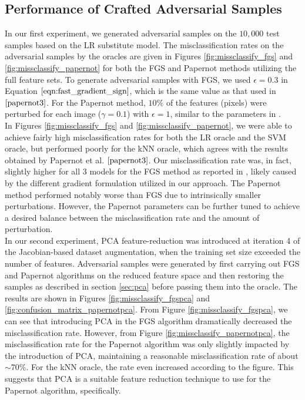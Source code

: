 \subsection{Performance of Crafted Adversarial Samples}
In our first experiment, we generated adversarial samples on the $10,000$ test samples based on the LR substitute model. The misclassification rates on the adversarial samples by the oracles are given in Figures \ref{fig:missclassify_fgs}  and \ref{fig:missclassify_papernot} for both the FGS and Papernot methods utilizing the full feature sets. To generate adversarial samples with FGS, we used $\epsilon = 0.3$ in Equation $\ref{eqn:fast_gradient_sign}$, which is the same value as that used in $\cite{papernot3}$. For the Papernot method, $10\%$ of the features (pixels) were perturbed for each image ($\gamma = 0.1$) with $\epsilon = 1$, similar to the parameters in \cite{papernot1}. \\
\indent In Figures \ref{fig:missclassify_fgs}  and \ref{fig:missclassify_papernot}, we were able to achieve fairly high misclassification rates for both the LR oracle and the SVM oracle, but performed poorly for the kNN oracle, which agrees with the results obtained by Papernot et al. $\cite{papernot3}$. Our misclassification rate was, in fact, slightly higher for all 3 models for the FGS method as reported in \cite{papernot3}, likely caused by the different gradient formulation utilized in our approach. The Papernot method performed notably worse than FGS due to intrinsically smaller perturbations. However, the Papernot parameters can be further tuned to achieve a desired balance between the misclassification rate and the amount of perturbation.\\
\indent In our second experiment, PCA feature-reduction was introduced at iteration 4 of the Jacobian-based dataset augmentation, when the training set size exceeded the number of features. Adversarial samples were generated by first carrying out FGS and Papernot algorithms on the reduced feature space and then restoring the samples as described in section \ref{sec:pca} before passing them into the oracle. The results are shown in Figures \ref{fig:missclassify_fgspca} and \ref{fig:confusion_matrix_papernotpca}. From Figure \ref{fig:missclassify_fgspca}, we can see that introducing PCA in the FGS algorithm dramatically decreased the misclassification rate. However, from Figure \ref{fig:missclassify_papernotpca}, the misclassification rate for the Papernot algorithm was only slightly impacted by the introduction of PCA, maintaining a reasonable misclassification rate of about $\sim 70\%$. For the kNN oracle, the rate even increased according to the figure. This suggests that PCA is a suitable feature reduction technique to use for the Papernot algorithm, specifically.\\
